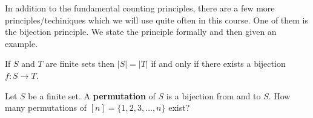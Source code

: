 In addition to the fundamental counting principles, there are a few more principles/techiniques which we will use quite often in this course. One of them is the bijection principle. We state the principle formally and then given an example.

\begin{theorem}
If $S$ and $T$ are finite sets then $|S|=|T|$ if and only if there exists a bijection $f:S\to T$.
\end{theorem}
 
\begin{question}
	Let $S$ be a finite set. A \textbf{permutation} of $S$ is a bijection from and to $S$. How many permutations of $[n]=\{1,2,3,\ldots,n\}$ exist?
\end{question}

